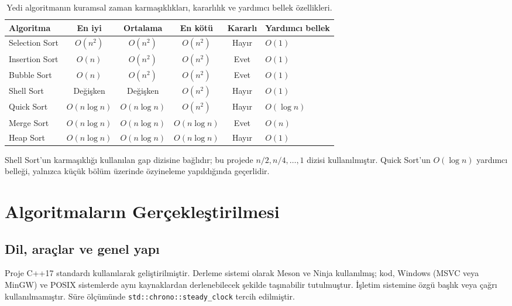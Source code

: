 \documentclass[12pt,a4paper]{article}
\begin{document}
\begin{table}[htbp]
  \centering
  \caption{Yedi algoritmanın kuramsal zaman karmaşıklıkları, kararlılık ve
           yardımcı bellek özellikleri.}
  \label{tab:teori}
  \small
  \begin{tabular}{lcccc l}
    \toprule
    Algoritma & En iyi & Ortalama & En kötü & Kararlı & Yardımcı bellek \\
    \midrule
    Selection Sort & $O(n^2)$ & $O(n^2)$ & $O(n^2)$ & Hayır & $O(1)$ \\
    Insertion Sort & $O(n)$   & $O(n^2)$ & $O(n^2)$ & Evet  & $O(1)$ \\
    Bubble Sort    & $O(n)$   & $O(n^2)$ & $O(n^2)$ & Evet  & $O(1)$ \\
    Shell Sort     & Değişken & Değişken & $O(n^2)$ & Hayır & $O(1)$ \\
    Quick Sort     & $O(n \log n)$ & $O(n \log n)$ & $O(n^2)$ & Hayır & $O(\log n)$ \\
    Merge Sort     & $O(n \log n)$ & $O(n \log n)$ & $O(n \log n)$ & Evet & $O(n)$ \\
    Heap Sort      & $O(n \log n)$ & $O(n \log n)$ & $O(n \log n)$ & Hayır & $O(1)$ \\
    \bottomrule
  \end{tabular}

  \par\smallskip
  \footnotesize Shell Sort'un karmaşıklığı kullanılan gap dizisine bağlıdır; bu
  projede $n/2, n/4, \dots, 1$ dizisi kullanılmıştır. Quick Sort'un $O(\log n)$
  yardımcı belleği, yalnızca küçük bölüm üzerinde özyineleme yapıldığında
  geçerlidir.
\end{table}

\section{Algoritmaların Gerçekleştirilmesi}

\subsection{Dil, araçlar ve genel yapı}

Proje C++17 standardı kullanılarak geliştirilmiştir. Derleme
sistemi olarak Meson ve Ninja kullanılmış; kod, Windows (MSVC veya MinGW) ve
POSIX sistemlerde aynı kaynaklardan derlenebilecek şekilde taşınabilir
tutulmuştur. İşletim sistemine özgü başlık veya çağrı kullanılmamıştır. Süre
ölçümünde \texttt{std::chrono::steady\_clock} tercih edilmiştir. 
\end{document}
